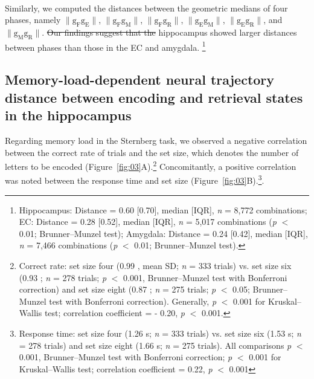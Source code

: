 \documentclass[final,3p,times,twocolumn]{elsarticle}
\providecommand{\DIFaddtex}[1]{{\protect\color{blue}\uwave{#1}}} %
\providecommand{\DIFdeltex}[1]{{\protect\color{red}\sout{#1}}}                      %
\providecommand{\DIFaddbegin}{} %
\providecommand{\DIFaddend}{} %
\providecommand{\DIFdelbegin}{} %
\providecommand{\DIFdelend}{} %
\providecommand{\DIFadd}[1]{\texorpdfstring{\DIFaddtex{#1}}{#1}} %
\providecommand{\DIFdel}[1]{\texorpdfstring{\DIFdeltex{#1}}{}} %
\newcommand{\DIFscaledelfig}{0.5}
\newlength{\DIFdelgraphicswidth} %
\newlength{\DIFdelgraphicsheight} %
\newcommand{\DIFaddincludegraphics}[2][]{{\color{blue}\fbox{\DIFOincludegraphics[#1]{#2}}}} %
\newcommand{\DIFdelincludegraphics}[2][]{%
\sbox{\DIFdelgraphicsbox}{\DIFOincludegraphics[#1]{#2}}%
\settoboxwidth{\DIFdelgraphicswidth}{\DIFdelgraphicsbox} %
\settoboxtotalheight{\DIFdelgraphicsheight}{\DIFdelgraphicsbox} %
\scalebox{\DIFscaledelfig}{%
\parbox[b]{\DIFdelgraphicswidth}{\usebox{\DIFdelgraphicsbox}\\[-\baselineskip] \rule{\DIFdelgraphicswidth}{0em}}\llap{\resizebox{\DIFdelgraphicswidth}{\DIFdelgraphicsheight}{%
\setlength{\unitlength}{\DIFdelgraphicswidth}%
\begin{picture}(1,1)%
\thicklines\linethickness{2pt} %
{\color[rgb]{1,0,0}\put(0,0){\framebox(1,1){}}}%
{\color[rgb]{1,0,0}\put(0,0){\line( 1,1){1}}}%
{\color[rgb]{1,0,0}\put(0,1){\line(1,-1){1}}}%
\end{picture}%
}\hspace*{3pt}}} %
} %
\DeclareRobustCommand{\DIFaddbegin}{\DIFOaddbegin \let\includegraphics\DIFaddincludegraphics} %
\DeclareRobustCommand{\DIFaddend}{\DIFOaddend \let\includegraphics\DIFOincludegraphics} %
\DeclareRobustCommand{\DIFdelbegin}{\DIFOdelbegin \let\includegraphics\DIFdelincludegraphics} %
\DeclareRobustCommand{\DIFdelend}{\DIFOaddend \let\includegraphics\DIFOincludegraphics} %
\begin{document}
\DIFdelend \DIFaddbegin \\
\indent
\DIFaddend Similarly, we computed the distances between the geometric medians of four phases, namely $\mathrm{\lVert g_{F}g_{E} \rVert}$, $\mathrm{\lVert g_{F}g_{M} \rVert}$, $\mathrm{\lVert g_{F}g_{R} \rVert}$, $\mathrm{\lVert g_{E}g_{M} \rVert}$, $\mathrm{\lVert g_{E}g_{R} \rVert}$, and $\mathrm{\lVert g_{M}g_{R} \rVert}$. \DIFdelbegin \DIFdel{Our findings suggest that the }\DIFdelend \DIFaddbegin \DIFadd{The }\DIFaddend hippocampus showed larger distances between phases than those in the EC and amygdala. \footnote{Hippocampus: Distance = 0.60 [0.70], median [IQR], \textit{n} = 8,772 combinations; EC: Distance = 0.28 [0.52], median [IQR], \textit{n} = 5,017 combinations (\textit{p} $<$ 0.01; Brunner--Munzel test); Amygdala: Distance = 0.24 [0.42], median [IQR], \textit{n} = 7,466 combinations (\textit{p} $<$ 0.01; Brunner--Munzel test).}

\subsection{Memory-load-dependent neural trajectory distance between encoding and retrieval states in the hippocampus}
Regarding memory load in the Sternberg task, we observed a negative correlation between the correct rate of trials and the set size, which denotes the number of letters to be encoded (Figure~\ref{fig:03}A).\footnote{Correct rate: set size four (0.99 , mean \textpm SD; \textit{n} = 333 trials) vs. set size six (0.93 ; \textit{n} = 278 trials; \textit{p} $<$ 0.001, Brunner--Munzel test with Bonferroni correction) and set size eight (0.87 ; \textit{n} = 275 trials; \textit{p} $<$ 0.05; Brunner--Munzel test with Bonferroni correction). Generally, \textit{p} $<$ 0.001 for Kruskal--Wallis test; correlation coefficient = - 0.20, \textit{p} $<$ 0.001.} Concomitantly, a positive correlation was noted between the response time and set size (Figure~\ref{fig:03}B).\footnote{Response time: set size four (1.26  s; \textit{n} = 333 trials) vs. set size six (1.53  s; \textit{n} = 278 trials) and set size eight (1.66  s; \textit{n} = 275 trials). All comparisons \textit{p} $<$ 0.001, Brunner--Munzel test with Bonferroni correction; \textit{p} $<$ 0.001 for Kruskal--Wallis test; correlation coefficient = 0.22, \textit{p} $<$ 0.001}.
\DIFdelbegin %
\end{document}
